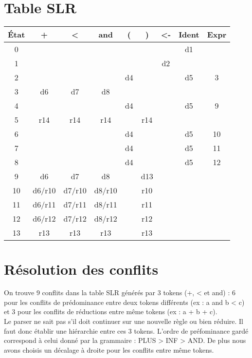 \documentclass[a4paper,12pt]{article}
\begin{document}
\section{Table SLR}
\begin{center}
  \begin{tabular}{| c || c | c | c | c | c | c | c || c |}
    \hline
      État & + & < & and & ( & ) & <- & Ident & Expr \\ \hline
      0 & & & & & & & d1 & \\ \hline
      1 & & & & & & d2 & & \\ \hline
      2 & & & & d4& & & d5 & 3 \\ \hline
      3 & d6& d7& d8 & & & & & \\ \hline
      4 & & & & d4& & & d5 & 9 \\ \hline
      5 &r14&r14&r14 & &r14& & & \\ \hline
      6 & & & & d4& & & d5 & 10 \\ \hline
      7 & & & & d4& & & d5 & 11 \\ \hline
      8 & & & & d4& & & d5 & 12 \\ \hline
      9 & d6& d7& d8& &d13& & & \\ \hline
      10 &d6/r10 &d7/r10 &d8/r10 & &r10& & & \\ \hline
      11 &d6/r11 &d7/r11 &d8/r11 & &r11& & & \\ \hline
      12 &d6/r12 &d7/r12 &d8/r12 & &r12& & & \\ \hline
      13 &r13&r13&r13 & &r13& & & \\ \hline
  \end{tabular}
\end{center}

\bigskip

\section{Résolution des conflits}

On trouve 9 conflits dans la table SLR générés par 3 tokens (+, < et and) : 6 pour les conflits de prédominance entre deux tokens différents (ex : a and b < c) et 3 pour les conflits de réductions entre même tokens (ex : a + b + c).\\
Le parser ne sait pas s'il doit continuer sur une nouvelle règle ou bien réduire. Il faut donc établir une hiérarchie entre ces 3 tokens.
L'ordre de préfominance gardé correspond à celui donné par la grammaire : PLUS > INF > AND.
De plus nous avons choisis un décalage à droite pour les conflits entre même tokens.
\end{document}
